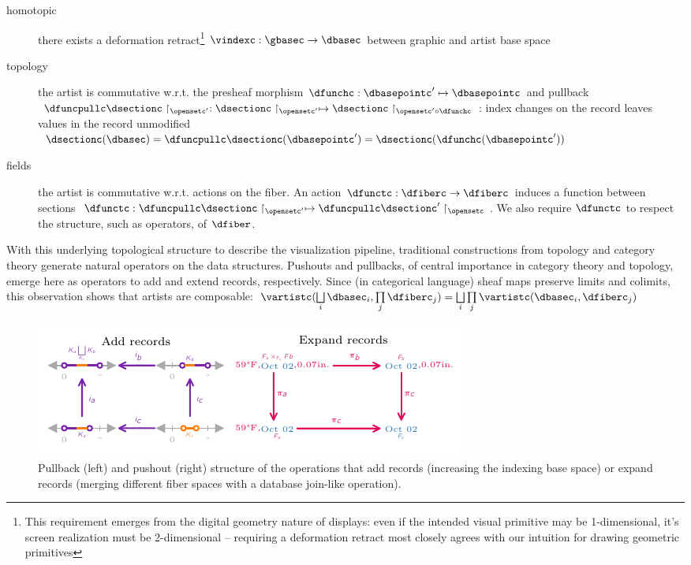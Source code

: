 \documentclass[preprint]{vgtc}
\begin{document}
\begin{description}
    \item[homotopic] there exists a deformation retract\footnote{This requirement emerges from the digital geometry nature of displays: even if the intended visual primitive may be 1-dimensional, it's screen realization must be 2-dimensional -- requiring a deformation retract most closely agrees with our intuition for drawing geometric primitives} $\vindexc: \gbasec\rightarrow\dbasec$ between graphic and artist base space
    \item[topology] the artist is commutative w.r.t. the presheaf morphism $\dfunchc: \dbasepointc^{\prime}\mapsto \dbasepointc$ and pullback $\dfuncpullc \dsectionc \restriction_{\opensetc^{\prime}}: \dsectionc\restriction_{\opensetc^{\prime}} \mapsto \dsectionc \restriction_{\opensetc^{\prime} \circ \dfunchc}$: index changes on the record leaves values in the record unmodified
    $\dsectionc(\dbasec) = \dfuncpullc\dsectionc(\dbasepointc^{\prime}) = \dsectionc(\dfunchc(\dbasepointc^{\prime}))$
    \item[fields] the artist is commutative w.r.t. actions on the fiber. An action $\dfunctc: \dfiberc\to\dfiberc$ induces a function between sections $\dfunctc: \dfuncpullc \dsectionc \restriction_{\opensetc^{\prime}} \mapsto \dfuncpullc \dsectionc^{\prime} \restriction_{\opensetc}$. We also require $\dfunctc$ to respect the structure, such as operators, of $\dfiber$.
\end{description}

With this underlying topological structure to describe the visualization pipeline, traditional constructions from topology and category theory generate natural operators on the data structures. Pushouts and pullbacks, of central importance in category theory and topology, emerge here as operators to add and extend records, respectively. Since (in categorical language) sheaf maps preserve limits and colimits, this observation shows that artists are composable: $\vartistc(\bigsqcup\limits_{i}\dbasec_i, \prod\limits_j\dfiberc_j) = \bigsqcup\limits_i\prod\limits_j\vartistc(\dbasec_i, \dfiberc_j)$


\begin{figure}[h]
\includegraphics[width=\textwidth]{more_records.pdf}
\caption{Pullback (left) and pushout (right) structure of the operations that add records (increasing the indexing base space) or expand records (merging different fiber spaces with a database join-like operation).}\label{fig:more-records}
\end{figure}
\end{document}
